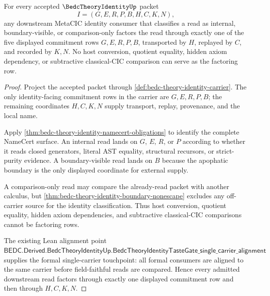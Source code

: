 \begin{theorem}
\label{thm:bedc-theory-identity-commitment-factorization}
For every accepted $\BedcTheoryIdentityUp$ packet
$$
I=(G,E,R,P,B,H,C,K,N),
$$
any downstream MetaCIC identity consumer that classifies a read as internal, boundary-visible, or comparison-only factors the read through exactly one of the five displayed commitment rows $G,E,R,P,B$, transported by $H$, replayed by $C$, and recorded by $K,N$. No host conversion, quotient equality, hidden axiom dependency, or subtractive classical-CIC comparison can serve as the factoring row.
\end{theorem}
\begin{proof}
Project the accepted packet through \autoref{def:bedc-theory-identity-carrier}. The only identity-facing commitment rows in the carrier are $G,E,R,P,B$; the remaining coordinates $H,C,K,N$ supply transport, replay, provenance, and the local name.

Apply \autoref{thm:bedc-theory-identity-namecert-obligations} to identify the complete NameCert surface. An internal read lands on $G$, $E$, $R$, or $P$ according to whether it reads closed generators, literal AST equality, structural recursors, or strict-purity evidence. A boundary-visible read lands on $B$ because the apophatic boundary is the only displayed coordinate for external supply.

A comparison-only read may compare the already-read packet with another calculus, but \autoref{thm:bedc-theory-identity-boundary-nonescape} excludes any off-carrier source for the identity classification. Thus host conversion, quotient equality, hidden axiom dependencies, and subtractive classical-CIC comparisons cannot be factoring rows.

The existing Lean alignment point $\mathsf{BEDC.Derived.BedcTheoryIdentityUp.BedcTheoryIdentityTasteGate\_single\_carrier\_alignment}$ supplies the formal single-carrier touchpoint: all formal consumers are aligned to the same carrier before field-faithful reads are compared. Hence every admitted downstream read factors through exactly one displayed commitment row and then through $H,C,K,N$.
\end{proof}


